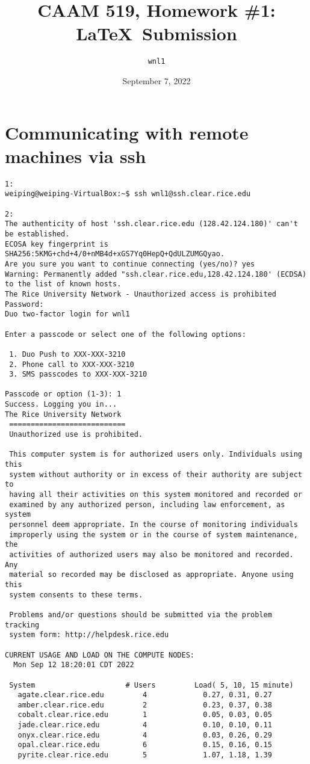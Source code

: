 \documentclass{article}
\title{CAAM 519, Homework \#1: \LaTeX\ Submission}
\author{\texttt{wnl1}}
\date{September 7, 2022}
\begin{document}
\maketitle

\section{Communicating with remote machines via ssh}

\begin{verbatim}
1:
weiping@weiping-VirtualBox:~$ ssh wnl1@ssh.clear.rice.edu

2:
The authenticity of host 'ssh.clear.rice.edu (128.42.124.180)' can't be established.
ECOSA key fingerprint is SHA256:5KMG+chd+4/0+nMB4d+xGS7Yq0HepQ+QdULZUMGQyao.
Are you sure you want to continue connecting (yes/no)? yes
Warning: Permanently added "ssh.clear.rice.edu,128.42.124.180' (ECDSA) to the list of known hosts.
The Rice University Network - Unauthorized access is prohibited
Password:
Duo two-factor login for wnl1

Enter a passcode or select one of the following options:

 1. Duo Push to XXX-XXX-3210
 2. Phone call to XXX-XXX-3210
 3. SMS passcodes to XXX-XXX-3210

Passcode or option (1-3): 1
Success. Logging you in...
The Rice University Network
 ===========================
 Unauthorized use is prohibited.

 This computer system is for authorized users only. Individuals using this
 system without authority or in excess of their authority are subject to
 having all their activities on this system monitored and recorded or
 examined by any authorized person, including law enforcement, as system
 personnel deem appropriate. In the course of monitoring individuals
 improperly using the system or in the course of system maintenance, the
 activities of authorized users may also be monitored and recorded. Any
 material so recorded may be disclosed as appropriate. Anyone using this
 system consents to these terms.

 Problems and/or questions should be submitted via the problem tracking
 system form: http://helpdesk.rice.edu

CURRENT USAGE AND LOAD ON THE COMPUTE NODES:
  Mon Sep 12 18:20:01 CDT 2022

 System                     # Users         Load( 5, 10, 15 minute)
   agate.clear.rice.edu         4             0.27, 0.31, 0.27
   amber.clear.rice.edu         2             0.23, 0.37, 0.38
   cobalt.clear.rice.edu        1             0.05, 0.03, 0.05
   jade.clear.rice.edu          4             0.10, 0.10, 0.11
   onyx.clear.rice.edu          4             0.03, 0.26, 0.29
   opal.clear.rice.edu          6             0.15, 0.16, 0.15
   pyrite.clear.rice.edu        5             1.07, 1.18, 1.39


\end{verbatim}
\end{document}
